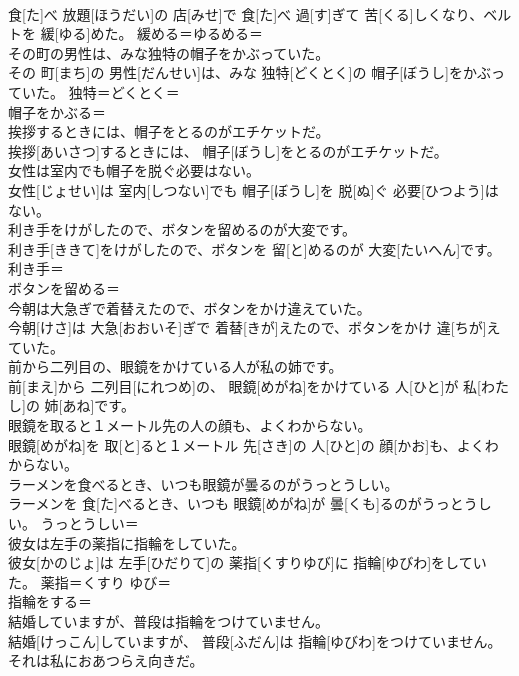 \documentclass[8pt]{extreport}
\begin{document}
\begin{CJK}{UTF8}{min}
\\	食[た]べ 放題[ほうだい]の 店[みせ]で 食[た]べ 過[す]ぎて 苦[くる]しくなり、ベルトを 緩[ゆる]めた。	緩める＝ゆるめる＝ 
\\	その町の男性は、みな独特の帽子をかぶっていた。	
\\	その 町[まち]の 男性[だんせい]は、みな 独特[どくとく]の 帽子[ぼうし]をかぶっていた。	独特＝どくとく＝ 
\\	帽子をかぶる＝ 
\\	挨拶するときには、帽子をとるのがエチケットだ。	
\\	挨拶[あいさつ]するときには、 帽子[ぼうし]をとるのがエチケットだ。	
\\	女性は室内でも帽子を脱ぐ必要はない。	
\\	女性[じょせい]は 室内[しつない]でも 帽子[ぼうし]を 脱[ぬ]ぐ 必要[ひつよう]はない。	
\\	利き手をけがしたので、ボタンを留めるのが大変です。	
\\	利き手[ききて]をけがしたので、ボタンを 留[と]めるのが 大変[たいへん]です。	利き手＝ 
\\	ボタンを留める＝ 
\\	今朝は大急ぎで着替えたので、ボタンをかけ違えていた。	
\\	今朝[けさ]は 大急[おおいそ]ぎで 着替[きが]えたので、ボタンをかけ 違[ちが]えていた。	
\\	前から二列目の、眼鏡をかけている人が私の姉です。	
\\	前[まえ]から 二列目[にれつめ]の、 眼鏡[めがね]をかけている 人[ひと]が 私[わたし]の 姉[あね]です。	
\\	眼鏡を取ると１メートル先の人の顔も、よくわからない。	
\\	眼鏡[めがね]を 取[と]ると１メートル 先[さき]の 人[ひと]の 顔[かお]も、よくわからない。	
\\	ラーメンを食べるとき、いつも眼鏡が曇るのがうっとうしい。	
\\	ラーメンを 食[た]べるとき、いつも 眼鏡[めがね]が 曇[くも]るのがうっとうしい。	うっとうしい＝ 
\\	彼女は左手の薬指に指輪をしていた。	
\\	彼女[かのじょ]は 左手[ひだりて]の 薬指[くすりゆび]に 指輪[ゆびわ]をしていた。	薬指＝くすり ゆび＝ 
\\	指輪をする＝ 
\\	結婚していますが、普段は指輪をつけていません。	
\\	結婚[けっこん]していますが、 普段[ふだん]は 指輪[ゆびわ]をつけていません。	
\\	それは私におあつらえ向きだ。	

\end{CJK}
\end{document}
